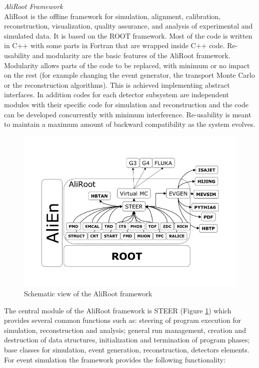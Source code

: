 {\Large\textsl{AliRoot Framework}}\\
AliRoot \cite{cite:ALICE} is the offline framework for simulation, alignment, calibration, reconstruction, visualization, quality assurance, and analysis of experimental and simulated data. It is based on the ROOT framework. Most of the code is written in C++ with some parts in Fortran that are wrapped inside C++ code. Re-usability and modularity are the basic features of the AliRoot framework. Modularity allows parts of the code to be replaced, with minimum or no impact on the rest (for example changing the event generator, the transport Monte Carlo or the reconstruction algorithms). This is achieved implementing abstract interfaces. In addition codes for each detector subsystem are independent modules with their specific code for simulation and reconstruction and the code can be developed concurrently with minimum interference. Re-usability is meant to maintain a maximum amount of backward compatibility as the system evolves.

\begin{figure}[htbp]
\begin{center}
\includegraphics[width=16.cm]{./Version1/FigChapter4/FigureAliRoot}
\caption{Schematic view of the AliRoot framework}
\label{fig:aliroot}
\end{center}
\end{figure}

The central module of the AliRoot framework is STEER (Figure \ref{fig:aliroot}) which provides several common functions such as: steering of program execution for simulation, reconstruction and analysis; general run management, creation and destruction of data structures, initialization and termination of program phases; base classes for simulation, event generation, reconstruction, detectors elements.
For event simulation the framework provides the following functionality:

\newpage
